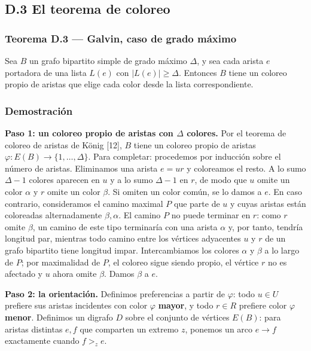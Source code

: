 \documentclass[
  11pt,
]{article}
\begin{document}
\subsection{D.3 El teorema de coloreo}\label{d.3-el-teorema-de-coloreo}

\subsubsection{Teorema D.3 --- Galvin, caso de grado máximo}\label{teorema-d.3-galvin-caso-de-grado-muxe1ximo}

Sea \(B\) un grafo bipartito simple de grado máximo \(\Delta\), y sea cada arista \(e\) portadora de una lista \(L(e)\) con \(|L(e)|\ge\Delta\). Entonces \(B\) tiene un coloreo propio de aristas que elige cada color desde la lista correspondiente.

\subsubsection{Demostración}\label{demostraciuxf3n-9}

\textbf{Paso 1: un coloreo propio de aristas con \(\Delta\) colores.} Por el teorema de coloreo de aristas de König {[}12{]}, \(B\) tiene un coloreo propio de aristas \(\varphi:E(B)\to\{1,\ldots,\Delta\}\). Para completar: procedemos por inducción sobre el número de aristas. Eliminamos una arista \(e=ur\) y coloreamos el resto. A lo sumo \(\Delta-1\) colores aparecen en \(u\) y a lo sumo \(\Delta-1\) en \(r\), de modo que \(u\) omite un color \(\alpha\) y \(r\) omite un color \(\beta\). Si omiten un color común, se lo damos a \(e\). En caso contrario, consideramos el camino maximal \(P\) que parte de \(u\) y cuyas aristas están coloreadas alternadamente \(\beta,\alpha\). El camino \(P\) no puede terminar en \(r\): como \(r\) omite \(\beta\), un camino de este tipo terminaría con una arista \(\alpha\) y, por tanto, tendría longitud par, mientras todo camino entre los vértices adyacentes \(u\) y \(r\) de un grafo bipartito tiene longitud impar. Intercambiamos los colores \(\alpha\) y \(\beta\) a lo largo de \(P\); por maximalidad de \(P\), el coloreo sigue siendo propio, el vértice \(r\) no es afectado y \(u\) ahora omite \(\beta\). Damos \(\beta\) a \(e\).

\textbf{Paso 2: la orientación.} Definimos preferencias a partir de \(\varphi\): todo \(u\in U\) prefiere sus aristas incidentes con color \(\varphi\) \textbf{mayor}, y todo \(r\in R\) prefiere color \(\varphi\) \textbf{menor}. Definimos un digrafo \(D\) sobre el conjunto de vértices \(E(B)\): para aristas distintas \(e,f\) que comparten un extremo \(z\), ponemos un arco \(e\to f\) exactamente cuando \(f>_ze\).
\end{document}
